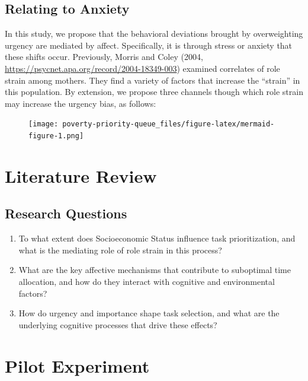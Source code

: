\documentclass[
]{report}
\begin{document}
\hypertarget{relating-to-anxiety}{%
\section{Relating to Anxiety}\label{relating-to-anxiety}}

In this study, we propose that the behavioral deviations brought by
overweighting urgency are mediated by affect. Specifically, it is
through stress or anxiety that these shifts occur. Previously, Morris
and Coley (2004, \url{https://psycnet.apa.org/record/2004-18349-003})
examined correlates of role strain among mothers. They find a variety of
factors that increase the ``strain'' in this population. By extension,
we propose three channels though which role strain may increase the
urgency bias, as follows:

\begin{figure}[H]

{\centering \texttt{[image: poverty-priority-queue\_files/figure-latex/mermaid-figure-1.png]}

}

\end{figure}

\hypertarget{literature-review}{%
\chapter{Literature Review}\label{literature-review}}

\hypertarget{research-questions}{%
\section{Research Questions}\label{research-questions}}

\begin{enumerate}
\def\labelenumi{\arabic{enumi}.}
\item
  To what extent does Socioeconomic Status influence task
  prioritization, and what is the mediating role of role strain in this
  process?
\item
  What are the key affective mechanisms that contribute to suboptimal
  time allocation, and how do they interact with cognitive and
  environmental factors?
\item
  How do urgency and importance shape task selection, and what are the
  underlying cognitive processes that drive these effects?
\end{enumerate}

\hypertarget{pilot-experiment}{%
\chapter{Pilot Experiment}\label{pilot-experiment}}
\end{document}
